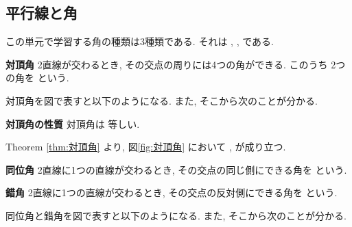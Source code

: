 \subsection{平行線と角}

この単元で学習する角の種類は3種類である. それは \fitblankbf[対頂角]{}, \fitblankbf[同位角]{}, \fitblankbf[錯角]{} である.

\begin{definitionbox}{\textbf{対頂角}}
    \label{def:対頂角}
    2直線が交わるとき, その交点の周りには4つの角ができる. このうち
    \fitblankbf[向かい合っている]{} 2つの角を \fitblankbf[対頂角]{} という.
\end{definitionbox}

対頂角を図で表すと以下のようになる. また, そこから次のことが分かる.
\vspace{2em}
\begin{center}
\end{center}

\begin{theorembox}{\textbf{対頂角の性質}}
    \label{thm:対頂角}
    対頂角は \fitblankbf[いつでも]{} 等しい.
\end{theorembox}
\vspace{1em}

Theorem \ref{thm:対頂角} より, 図\ref{fig:対頂角} において \fitblankbf[\angle a = \angle c]{}, \fitblankbf[\angle b = \angle d]{} が成り立つ.

\newpage

\begin{definitionbox}{\textbf{同位角}}
    \label{def:同位角}
    2直線に1つの直線が交わるとき, その交点の同じ側にできる角を \fitblankbf[同位角]{} という.
\end{definitionbox}

\begin{definitionbox}{\textbf{錯角}}
    \label{def:錯角}
    2直線に1つの直線が交わるとき, その交点の反対側にできる角を \fitblankbf[錯角]{} という.
\end{definitionbox}

同位角と錯角を図で表すと以下のようになる. また, そこから次のことが分かる.
\vspace{2em}

